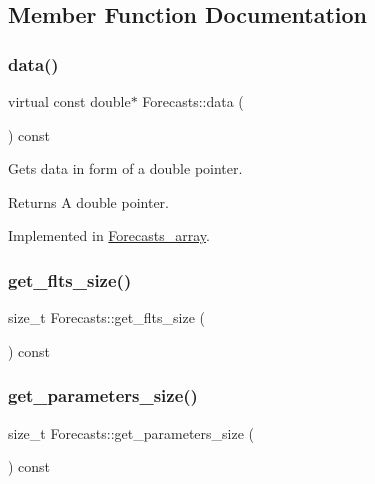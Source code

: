 \subsection{Member Function Documentation}
\mbox{\label{class_forecasts_abd9768fd95e64920efa89c2c9115cb4d}} 
\subsubsection{\texorpdfstring{data()}{data()}}
{\footnotesize\ttfamily virtual const double$\ast$ Forecasts\+::data (\begin{DoxyParamCaption}{ }\end{DoxyParamCaption}) const\hspace{0.3cm}{\ttfamily [pure virtual]}}

Gets data in form of a double pointer. \begin{DoxyReturn}{Returns}
A double pointer. 
\end{DoxyReturn}


Implemented in \mbox{\hyperlink{class_forecasts__array_ae7af8dfc4b7a7970310d06bf71069200}{Forecasts\+\_\+array}}.

\mbox{\label{class_forecasts_a5cea0e9e7f39a95a26878fefc0c29b7b}} 
\subsubsection{\texorpdfstring{get\+\_\+flts\+\_\+size()}{get\_flts\_size()}}
{\footnotesize\ttfamily size\+\_\+t Forecasts\+::get\+\_\+flts\+\_\+size (\begin{DoxyParamCaption}{ }\end{DoxyParamCaption}) const}

\mbox{\label{class_forecasts_a445efc69dce930a1c308d17289466e68}} 
\subsubsection{\texorpdfstring{get\+\_\+parameters\+\_\+size()}{get\_parameters\_size()}}
{\footnotesize\ttfamily size\+\_\+t Forecasts\+::get\+\_\+parameters\+\_\+size (\begin{DoxyParamCaption}{ }\end{DoxyParamCaption}) const}

